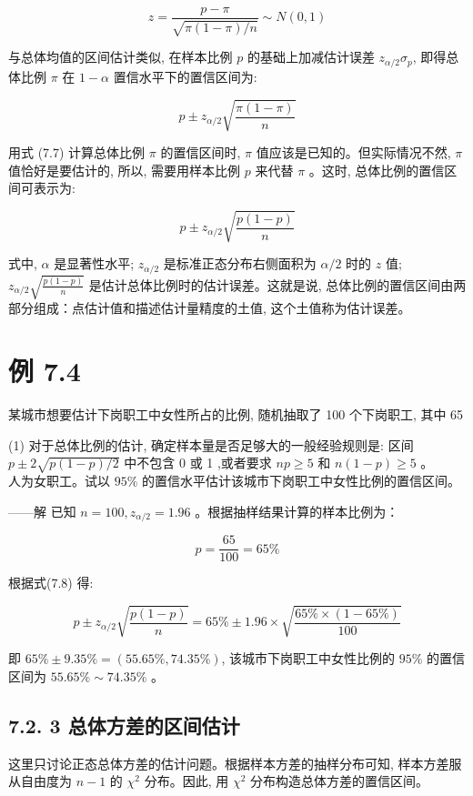 \documentclass[10pt]{article}
\begin{document}
\begin{CJK*}{UTF8}{bsmi}
\begin{equation*}
z=\frac{p-\pi}{\sqrt{\pi(1-\pi) / n}} \sim N(0,1) \tag{7.6}
\end{equation*}


与总体均值的区间估计类似, 在样本比例 $p$ 的基础上加减估计误差 $z_{\alpha / 2} \sigma_{p}$, 即得总体比例 $\pi$ 在 $1-\alpha$ 置信水平下的置信区间为:


\begin{equation*}
p \pm z_{\alpha / 2} \sqrt{\frac{\pi(1-\pi)}{n}} \tag{7.7}
\end{equation*}


用式 (7.7) 计算总体比例 $\pi$ 的置信区间时, $\pi$ 值应该是已知的。但实际情况不然, $\pi$ 值恰好是要估计的, 所以, 需要用样本比例 $p$ 来代替 $\pi$ 。这时, 总体比例的置信区间可表示为:


\begin{equation*}
p \pm z_{\alpha / 2} \sqrt{\frac{p(1-p)}{n}} \tag{7.8}
\end{equation*}


式中, $\alpha$ 是显著性水平; $z_{\alpha / 2}$ 是标准正态分布右侧面积为 $\alpha / 2$ 时的 $z$ 值; $z_{\alpha / 2} \sqrt{\frac{p(1-p)}{n}}$ 是估计总体比例时的估计误差。这就是说, 总体比例的置信区间由两部分组成：点估计值和描述估计量精度的土值, 这个土值称为估计误差。

\section*{例 7.4}
某城市想要估计下岗职工中女性所占的比例, 随机抽取了 100 个下岗职工, 其中 65

(1) 对于总体比例的估计, 确定样本量是否足够大的一般经验规则是: 区间 $p \pm 2 \sqrt{p(1-p) / 2}$ 中不包含 0 或 1 ,或者要求 $n p \geqslant 5$ 和 $n(1-p) \geqslant 5$ 。\\
人为女职工。试以 $95 \%$ 的置信水平估计该城市下岗职工中女性比例的置信区间。

——解 已知 $n=100, z_{\alpha / 2}=1.96$ 。根据抽样结果计算的样本比例为：

$$
p=\frac{65}{100}=65 \%
$$

根据式(7.8) 得:

$$
p \pm z_{\alpha / 2} \sqrt{\frac{p(1-p)}{n}}=65 \% \pm 1.96 \times \sqrt{\frac{65 \% \times(1-65 \%)}{100}}
$$

即 $65 \% \pm 9.35 \%=(55.65 \%, 74.35 \%)$, 该城市下岗职工中女性比例的 $95 \%$ 的置信区间为 $55.65 \% \sim 74.35 \%$ 。

\subsection*{7.2. 3 总体方差的区间估计}
这里只讨论正态总体方差的估计问题。根据样本方差的抽样分布可知, 样本方差服从自由度为 $n-1$ 的 $\chi^{2}$ 分布。因此, 用 $\chi^{2}$ 分布构造总体方差的置信区间。


\end{CJK*}
\end{document}
